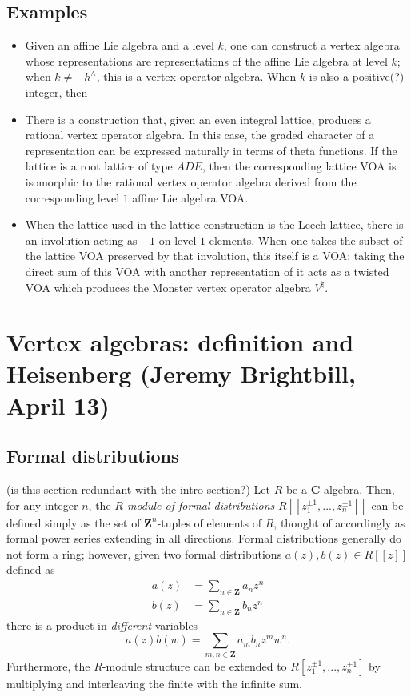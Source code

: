 \documentclass{article}
\newcommand{\CC}{\mathbold{C}}
\newcommand{\ZZ}{\mathbold{Z}}
\begin{document}
\subsection{Examples}
\begin{itemize}
\item Given an affine Lie algebra and a level $k$, one can construct a vertex algebra whose representations are representations of the affine Lie algebra at level $k$; when $k \ne - h^\wedge$, this is a vertex operator algebra.  When $k$ is also a positive(?) integer, then 
\item There is a construction that, given an even integral lattice, produces a rational vertex operator algebra.  In this case, the graded character of a representation can be expressed naturally in terms of theta functions.  If the lattice is a root lattice of type $ADE$, then the corresponding lattice VOA is isomorphic to the rational vertex operator algebra derived from the corresponding level $1$ affine Lie algebra VOA.
\item When the lattice used in the lattice construction is the Leech lattice, there is an involution acting as $-1$ on level $1$ elements.  When one takes the subset of the lattice VOA preserved by that involution, this itself is a VOA; taking the direct sum of this VOA with another representation of it acts as a twisted VOA which produces the Monster vertex operator algebra $V^\natural$.
\end{itemize}

\section{Vertex algebras: definition and Heisenberg (Jeremy Brightbill, April 13)}
\label{sec:defheis}

\subsection{Formal distributions}
(is this section redundant with the intro section?)
Let $R$ be a $\CC$-algebra.  Then, for any integer $n$, the \textit{$R$-module of formal distributions} $R[[z_1^{\pm 1},...,z_n^{\pm 1}]]$ can be defined simply as the set of $\ZZ^n$-tuples of elements of $R$, thought of accordingly as formal power series extending in all directions.  Formal distributions generally do not form a ring; however, given two formal distributions $a(z),b(z) \in R[[z]]$ defined as
\begin{align*}
  a(z)&=\sum_{n \in \ZZ}a_nz^n\\
  b(z)&=\sum_{n \in \ZZ}b_nz^n
\end{align*}
there is a product in \textit{different} variables
\[a(z)b(w) = \sum_{m,n \in \ZZ}a_mb_nz^mw^n. \]
Furthermore, the $R$-module structure can be extended to $R[z_1^{\pm 1},...,z_n^{\pm 1}]$ by multiplying and interleaving the finite with the infinite sum.
\end{document}
